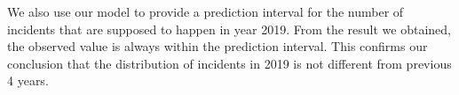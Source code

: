 \documentclass[11pt,a4paper,english]{article}
\begin{document}
We also use our model to provide a prediction interval for the number of incidents that are supposed to happen in year 2019. From the result we obtained, the observed value is always within the prediction interval. This confirms our conclusion that the distribution of incidents in 2019 is not different from previous 4 years.



\end{document}
